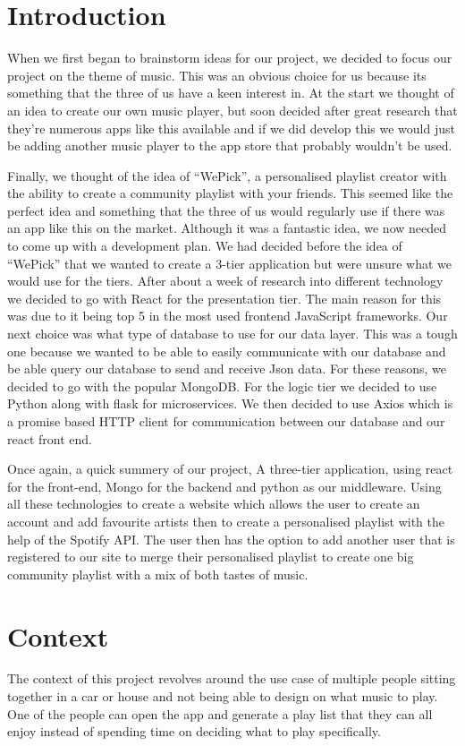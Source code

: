 \chapter{Introduction}
When we first began to brainstorm ideas for our project, we decided to focus our project on the theme of music. This was an obvious choice for us because its something that the three of us have a keen interest in. At the start we thought of an idea to create our own music player, but soon decided after great research that they’re numerous apps like this available and if we did develop this we would just be adding another music player to the app store that probably wouldn’t be used. 
\par
Finally, we thought of the idea of “WePick”, a personalised playlist creator with the ability to create a community playlist with your friends. This seemed like the perfect idea and something that the three of us would regularly use if there was an app like this on the market. Although it was a fantastic idea, we now needed to come up with a development plan. We had decided before the idea of “WePick” that we wanted to create a 3-tier application but were unsure what we would use for the tiers. After about a week of research into different technology we decided to go with React for the presentation tier. The main reason for this was due to it being top 5 in the most used frontend JavaScript frameworks. Our next choice was what type of database to use for our data layer. This was a tough one because we wanted to be able to easily communicate with our database and be able query our database to send and receive Json data. For these reasons, we decided to go with the popular MongoDB. For the logic tier we decided to use Python along with flask for microservices. We then decided to use Axios which is a promise based HTTP client for communication between our database and our react front end.
\par
Once again, a quick summery of our project, A three-tier application, using react for the front-end, Mongo for the backend and python as our middleware. Using all these technologies to create a website which allows the user to create an account and add favourite artists then to create a personalised playlist with the help of the Spotify API. The user then has the option to add another user that is registered to our site to merge their personalised playlist to create one big community playlist with a mix of both tastes of music.



\chapter{Context}
The context of this project revolves around the use case of multiple people sitting together in a car or house and not being able to design on what music to play. One of the people can open the app and generate a play list that they can all enjoy instead of spending time on deciding what to play specifically.

